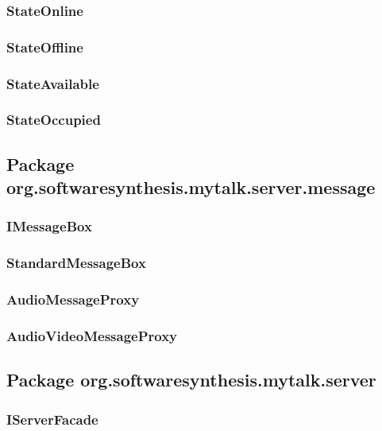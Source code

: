 \subsubsection{StateOnline}

\subsubsection{StateOffline}

\subsubsection{StateAvailable}

\subsubsection{StateOccupied}

\subsection{Package org.softwaresynthesis.mytalk.server.message}

\subsubsection{IMessageBox}

\subsubsection{StandardMessageBox}

\subsubsection{AudioMessageProxy}

\subsubsection{AudioVideoMessageProxy}

\subsection{Package org.softwaresynthesis.mytalk.server}

\subsubsection{IServerFacade}

